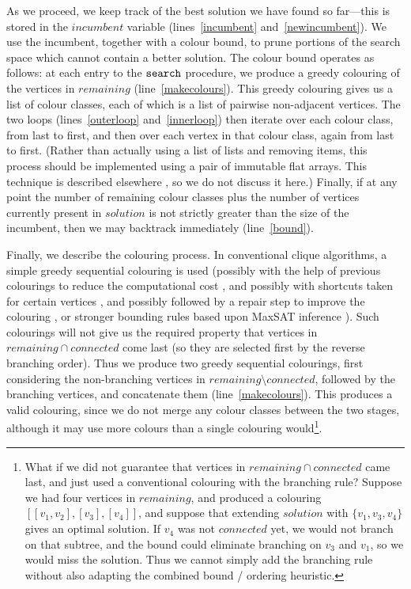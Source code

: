 \documentclass{llncs}
\newcommand{\lineref}[1]{line~\ref{#1}}
\newcommand{\twolinesref}[2]{lines~\ref{#1} and~\ref{#2}}
\begin{document}
As we proceed, we keep track of the best solution we have found so far---this is stored in the
$\mathit{incumbent}$ variable (\twolinesref{incumbent}{newincumbent}). We use the incumbent,
together with a colour bound, to prune portions of the search space which cannot contain a better
solution. The colour bound operates as follows: at each entry to the $\FuncSty{search}$ procedure,
we produce a greedy colouring of the vertices in $\mathit{remaining}$ (\lineref{makecolours}). This
greedy colouring gives us a list of colour classes, each of which is a list of pairwise non-adjacent
vertices. The two loops (\twolinesref{outerloop}{innerloop}) then iterate over each colour class,
from last to first, and then over each vertex in that colour class, again from last to first.
(Rather than actually using a list of lists and removing items, this process should be implemented
using a pair of immutable flat arrays. This technique is described elsewhere
\cite{DBLP:conf/cp/McCreeshP14}, so we do not discuss it here.) Finally, if at any point the number
of remaining colour classes plus the number of vertices currently present in $\mathit{solution}$ is
not strictly greater than the size of the incumbent, then we may backtrack immediately
(\lineref{bound}).

Finally, we describe the colouring process. In conventional clique algorithms, a simple greedy
sequential colouring is used (possibly with the help of previous colourings to reduce the
computational cost \cite{DBLP:conf/lion/NikolaevBS15}, and possibly with shortcuts taken for certain
vertices \cite{DBLP:journals/cor/SegundoT14}, and possibly followed by a repair step to
improve the colouring \cite{DBLP:conf/walcom/TomitaSHTW10}, or stronger bounding rules based upon
MaxSAT inference \cite{DBLP:conf/ictai/LiFX13,DBLP:conf/lion/LiJX15,DBLP:journals/cor/SegundoNB15}).
Such colourings will not give us the required property that vertices in $\mathit{remaining} \cap
\mathit{connected}$ come last (so they are selected first by the reverse branching order). Thus we
produce two greedy sequential colourings, first considering the non-branching vertices in
$\mathit{remaining} \setminus \mathit{connected}$, followed by the branching vertices, and
concatenate them (\lineref{makecolours}). This produces a valid colouring, since we do not merge any
colour classes between the two stages, although it may use more colours than a single colouring
would\footnote{What if we did not guarantee that vertices in $\mathit{remaining} \cap
    \mathit{connected}$ came last, and just used a conventional colouring with the branching rule?
    Suppose we had four vertices in $\mathit{remaining}$, and produced a colouring $[[v_1, v_2],
    [v_3], [v_4]]$, and suppose that extending $\mathit{solution}$ with $\{ v_1, v_3, v_4 \}$ gives
an optimal solution. If $v_4$ was not $\mathit{connected}$ yet, we would not branch on that subtree,
and the bound could eliminate branching on $v_3$ and $v_1$, so we would miss the solution. Thus we
cannot simply add the branching rule without also adapting the combined bound / ordering heuristic.}.
\end{document}
